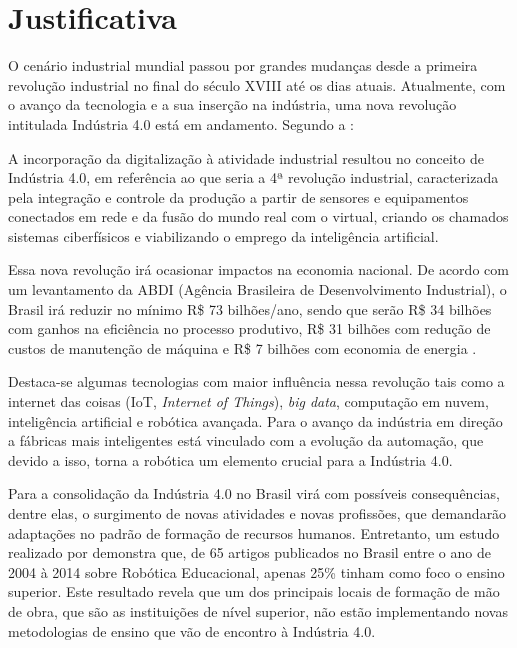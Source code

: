 \section{Justificativa}
\label{sec:justificativa}
O cenário industrial mundial passou por grandes mudanças desde a primeira revolução industrial no final do século XVIII até os dias atuais. Atualmente, com o avanço da tecnologia e a sua inserção na indústria, uma nova revolução intitulada Indústria 4.0 está em andamento. Segundo a :
\begin{quoting}[rightmargin=0cm,leftmargin=4cm]
\begin{singlespace}
{\footnotesize
A incorporação da digitalização à atividade industrial resultou no conceito de Indústria 4.0, em referência ao que seria a 4ª revolução industrial, caracterizada pela integração e controle da produção a partir de sensores e equipamentos conectados em rede e da fusão do mundo real com o virtual, criando os chamados sistemas ciberfísicos e viabilizando o emprego da inteligência artificial.
}
\end{singlespace}
\end{quoting}

Essa nova revolução irá ocasionar impactos na economia nacional. De acordo com um levantamento da ABDI (Agência Brasileira de Desenvolvimento Industrial), o Brasil irá reduzir no mínimo R\$ 73 bilhões/ano, sendo que serão R\$ 34 bilhões com ganhos na eficiência no processo produtivo, R\$ 31 bilhões com redução de custos de manutenção de máquina e  R\$ 7 bilhões com economia de energia \cite{abdi}.

Destaca-se algumas tecnologias com maior influência nessa revolução tais como a internet das coisas (IoT, \textit{Internet of Things}), \textit{big data}, computação em nuvem, inteligência artificial e robótica avançada. Para  o avanço da indústria em direção a fábricas mais inteligentes está vinculado com a evolução da automação, que devido a isso, torna a robótica um elemento crucial para a Indústria 4.0.

Para  a consolidação da Indústria 4.0 no Brasil virá com possíveis consequências, dentre elas, o surgimento de novas atividades e novas profissões, que demandarão adaptações no padrão de formação de recursos humanos. Entretanto, um estudo realizado por  demonstra que, de 65 artigos publicados no Brasil entre o ano de 2004 à 2014 sobre Robótica Educacional, apenas 25\% tinham como foco o ensino superior. Este resultado revela que um dos principais locais de formação de mão de obra, que são as instituições de nível superior, não estão implementando novas metodologias de ensino que vão de encontro à Indústria 4.0.    


